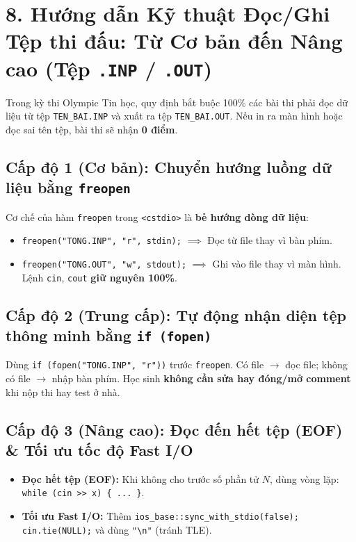 \documentclass[11pt,a4paper]{article}
\begin{document}
\newpage

\section*{\color{AsianDarkBlue}\normalsize 8. Hướng dẫn Kỹ thuật Đọc/Ghi Tệp thi đấu: Từ Cơ bản đến Nâng cao (Tệp \texttt{.INP} / \texttt{.OUT})}

Trong kỳ thi Olympic Tin học, quy định bắt buộc 100\% các bài thi phải đọc dữ liệu từ tệp \texttt{TEN\_BAI.INP} và xuất ra tệp \texttt{TEN\_BAI.OUT}. Nếu in ra màn hình hoặc đọc sai tên tệp, bài thi sẽ nhận \textbf{0 điểm}.

\vspace{-1mm}
\subsection*{\color{AsianBlue}\footnotesize Cấp độ 1 (Cơ bản): Chuyển hướng luồng dữ liệu bằng \texttt{freopen}}
Cơ chế của hàm \texttt{freopen} trong \texttt{<cstdio>} là \textbf{bẻ hướng dòng dữ liệu}:
\begin{itemize}
    \setlength{\itemsep}{0pt}
    \footnotesize
    \item \texttt{freopen("TONG.INP", "r", stdin);} $\implies$ Đọc từ file thay vì bàn phím.
    \item \texttt{freopen("TONG.OUT", "w", stdout);} $\implies$ Ghi vào file thay vì màn hình. Lệnh \texttt{cin}, \texttt{cout} \textbf{giữ nguyên 100\%}.
\end{itemize}

\vspace{-2mm}
\subsection*{\color{AsianBlue}\footnotesize Cấp độ 2 (Trung cấp): Tự động nhận diện tệp thông minh bằng \texttt{if (fopen)}}
Dùng \texttt{if (fopen("TONG.INP", "r"))} trước \texttt{freopen}. Có file $\to$ đọc file; không có file $\to$ nhập bàn phím. Học sinh \textbf{không cần sửa hay đóng/mở comment} khi nộp thi hay test ở nhà.

\vspace{-2mm}
\subsection*{\color{AsianBlue}\footnotesize Cấp độ 3 (Nâng cao): Đọc đến hết tệp (EOF) \& Tối ưu tốc độ Fast I/O}
\begin{itemize}
    \setlength{\itemsep}{0pt}
    \footnotesize
    \item \textbf{Đọc hết tệp (EOF):} Khi không cho trước số phần tử $N$, dùng vòng lặp: \texttt{while (cin >> x) \{ ... \}}.
    \item \textbf{Tối ưu Fast I/O:} Thêm \texttt{ios\_base::sync\_with\_stdio(false); cin.tie(NULL);} và dùng \texttt{"\textbackslash n"} (tránh TLE).
\end{itemize}
\end{document}
